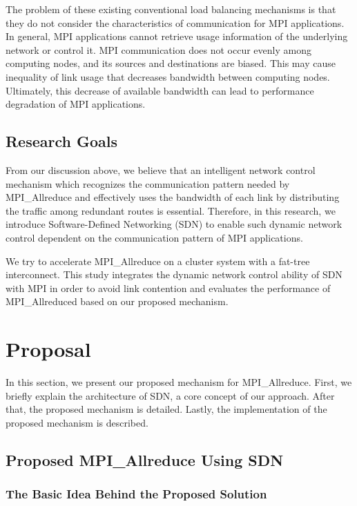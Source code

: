 The problem of these existing conventional load balancing mechanisms is
that they do not consider the characteristics of communication for MPI
applications. In general, MPI applications cannot retrieve usage
information of the underlying network or control it. MPI communication
does not occur evenly among computing nodes, and its sources and
destinations are biased. This may cause inequality of link usage that
decreases bandwidth between computing nodes. Ultimately, this decrease
of available bandwidth can lead to performance degradation of MPI
applications.

\subsection{Research Goals}

From our discussion above, we believe that an intelligent network control
mechanism which recognizes the communication pattern needed by MPI\_Allreduce
and effectively uses the bandwidth of each link by distributing the traffic
among redundant routes is essential. Therefore, in this research, we introduce
Software-Defined Networking (SDN) to enable such dynamic network control
dependent on the communication pattern of MPI applications.

We try to accelerate MPI\_Allreduce on a cluster system with a fat-tree
interconnect. This study integrates the dynamic network control ability of SDN
with MPI in order to avoid link contention and evaluates the performance of
MPI\_Allreduced based on our proposed mechanism.

\section{Proposal}\label{sec:iii-proposal}

In this section, we present our proposed mechanism for
MPI\_Allreduce. First, we briefly explain the architecture of
SDN, a core concept of our approach. After that, the proposed mechanism
is detailed. Lastly, the implementation of the proposed mechanism is
described.

\subsection{Proposed MPI\_Allreduce Using SDN}

\subsubsection{The Basic Idea Behind the Proposed Solution}

